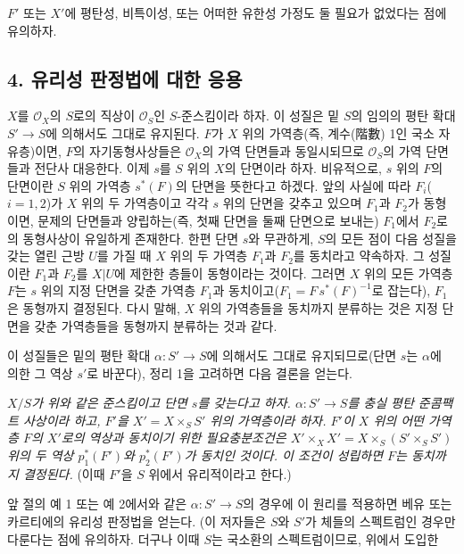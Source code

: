 $F'$ 또는 $X'$에 평탄성, 비특이성, 또는 어떠한 유한성 가정도 둘 필요가
없었다는 점에 유의하자.

\subsection*{4. 유리성 판정법에 대한 응용}

$X$를 $\mathcal O_X$의 $S$로의 직상이 $\mathcal O_S$인
$S$-준스킴이라 하자. 이 성질은 밑 $S$의 임의의 평탄 확대
$S'\longrightarrow S$에 의해서도 그대로 유지된다. $F$가 $X$ 위의
가역층(즉, 계수(階數) 1인 국소 자유층)이면, $F$의 자기동형사상들은
$\mathcal O_X$의 가역 단면들과 동일시되므로 $\mathcal O_S$의 가역
단면들과 전단사 대응한다. 이제 $s$를 $S$ 위의 $X$의 단면이라 하자.
비유적으로, $s$ 위의 $F$의 단면이란 $S$ 위의 가역층 $s^*(F)$의 단면을
뜻한다고 하겠다. 앞의 사실에 따라 $F_i$($i=1,2$)가 $X$ 위의 두
가역층이고 각각 $s$ 위의 단면을 갖추고 있으며 $F_1$과 $F_2$가
동형이면, 문제의 단면들과 양립하는(즉, 첫째 단면을 둘째 단면으로 보내는)
$F_1$에서 $F_2$로의 동형사상이 유일하게 존재한다. 한편 단면 $s$와
무관하게, $S$의 모든 점이 다음 성질을 갖는 열린 근방 $U$를 가질 때
$X$ 위의 두 가역층 $F_1$과 $F_2$를 동치라고 약속하자. 그 성질이란
$F_1$과 $F_2$를 $X|U$에 제한한 층들이 동형이라는 것이다. 그러면
$X$ 위의 모든 가역층 $F$는 $s$ 위의 지정 단면을 갖춘 가역층 $F_1$과
동치이고($F_1=F\,s^*(F)^{-1}$로 잡는다), $F_1$은 동형까지 결정된다.
다시 말해, $X$ 위의 가역층들을 동치까지 분류하는 것은 지정 단면을 갖춘
가역층들을 동형까지 분류하는 것과 같다.

이 성질들은 밑의 평탄 확대 $\alpha:S'\longrightarrow S$에 의해서도
그대로 유지되므로(단면 $s$는 $\alpha$에 의한 그 역상 $s'$로 바꾼다),
정리 1을 고려하면 다음 결론을 얻는다.

\emph{$X/S$가 위와 같은 준스킴이고 단면 $s$를 갖는다고 하자.
$\alpha:S'\longrightarrow S$를 충실 평탄 준콤팩트 사상이라 하고,
$F'$을 $X'=X\times_SS'$ 위의 가역층이라 하자. $F'$이 $X$ 위의 어떤
가역층 $F$의 $X'$로의 역상과 동치이기 위한 필요충분조건은
$X'\times_XX'=X\times_S(S'\times_SS')$ 위의 두 역상
$p_1^*(F')$와 $p_2^*(F')$가 동치인 것이다. 이 조건이 성립하면 $F$는
동치까지 결정된다.} (이때 $F'$을 $S$ 위에서 유리적이라고 한다.)

앞 절의 예 1 또는 예 2에서와 같은 $\alpha:S'\longrightarrow S$의
경우에 이 원리를 적용하면 베유 또는 카르티에의 유리성 판정법을 얻는다.
(이 저자들은 $S$와 $S'$가 체들의 스펙트럼인 경우만 다룬다는 점에
유의하자. 더구나 이때 $S$는 국소환의 스펙트럼이므로, 위에서 도입한

